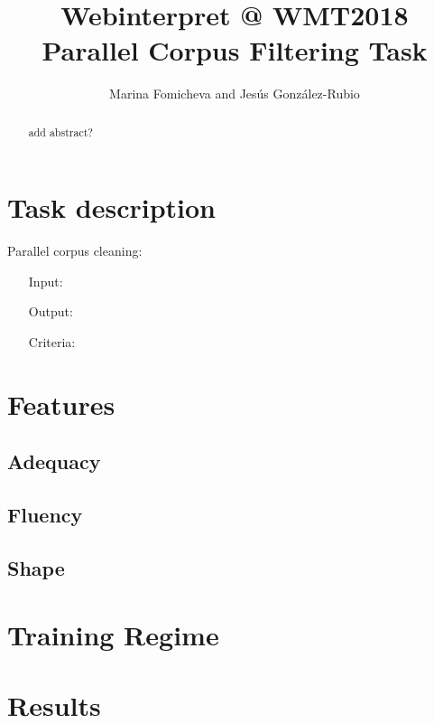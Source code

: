 \documentclass[a0]{sciposter}
\title{Webinterpret @ WMT2018\\Parallel Corpus Filtering Task}
\author{Marina Fomicheva and Jes\'{u}s Gonz\'{a}lez-Rubio}
\institute{AT Language Solutions, Webinterpret}
\begin{document}
\maketitle

\begin{multicols*}{3}


\begin{abstract}
add abstract?
\end{abstract}

\section{Task description}

Parallel corpus cleaning:
\begin{enumerate}
  \item[Input:]
  \item[Output:]
  \item[Criteria:]
\end{enumerate}

\section{Features}

\subsection{Adequacy}

\subsection{Fluency}

\subsection{Shape}

\section{Training Regime}


\section{Results}

\end{multicols*}
\end{document}
